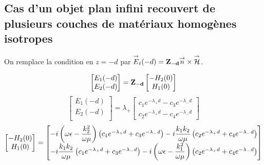 \subsection{Cas d'un objet plan infini recouvert de plusieurs couches de matériaux homogènes isotropes}

On remplace la condition en $z=-d$ par ${\overset{\rightarrow}{E}}_t(-d) = \mathbf{Z_{-d}} {\overset{\rightarrow}{n}} \times {\overset{\rightarrow}{\mathcal{H}}}$.

\begin{equation}
    \begin{bmatrix}
        E_1(-d)\\
        E_2(-d)\\
    \end{bmatrix}
    =
    \mathbf{Z_{-d}} 
    \begin{bmatrix}
        -H_2(0)\\
        H_1(0)\\
    \end{bmatrix}
\end{equation}
\begin{equation}
    \begin{bmatrix}
        E_1(-d)\\
        E_2(-d)\\
    \end{bmatrix}
    = \lambda_{+}
    \begin{bmatrix}
        c_1 e^{-\lambda_+ d} - c_3 e^{-\lambda_- d} \\
        c_2 e^{-\lambda_+ d} - c_4 e^{-\lambda_- d}
    \end{bmatrix}
\end{equation}
\begin{equation}
    \begin{bmatrix}
        -H_2(0)\\
        H_1(0)\\
    \end{bmatrix}
    =
    \begin{bmatrix}
        -i\left(\omega\epsilon-\dfrac{k_2^2}{\omega\mu}\right)\left(c_1 e^{-\lambda_+ d} + c_3 e^{-\lambda_- d}\right) - i\dfrac{k_1k_2}{\omega\mu}\left(c_2e^{-\lambda_+ d} + c_4e^{-\lambda_- d}\right)\\
        -i\dfrac{k_1k_2}{\omega\mu}\left(c_1 e^{-\lambda_+ d} + c_3 e^{-\lambda_- d} \right) - i\left(\omega\epsilon-\dfrac{k_1^2}{\omega\mu}\right)\left(c_2e^{-\lambda_+ d} + c_4e^{-\lambda_- d}\right)\\
    \end{bmatrix}
\end{equation}


